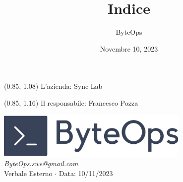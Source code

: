 \documentclass{article}
\title{\textbf{\fontsize{28}{6}\selectfont Indice}}
\author{\fontsize{14}{6}\selectfont ByteOps}
\date{Novembre 10, 2023}
\begin{document}

\begin{textblock*}{\textwidth}(0.85\textwidth, 1.08\textheight)
L'azienda: Sync Lab
\end{textblock*}

\begin{textblock*}{\textwidth}(0.85\textwidth, 1.16\textheight)
Il responsabile: Francesco Pozza
\end{textblock*}


\pagestyle{fancy}
\begin{center}
\includegraphics[width = 0.7\textwidth]{../../../Images/logo.png} \\
\vspace{0.2cm}
\textcolor[RGB]{60, 60, 60}{\textit{ByteOps.swe@gmail.com}} \\
\vspace{1cm}
\fontsize{16}{6}\selectfont Verbale Esterno $\cdot$ Data: 10/11/2023 \\
\vspace{0.5cm}
\end{center}
\end{document}
